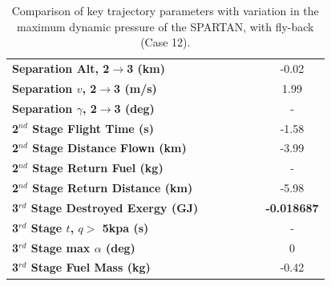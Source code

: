 \begin{table}[ht]
\begin{tabular}{l c c c c c c}
		\textbf{Separation Alt, 2$\rightarrow$3 (km)}
		& \secondthirdSeparationAltqForty
		& \secondthirdSeparationAltqFortyFive
		& \secondthirdSeparationAltqStandard
		& \secondthirdSeparationAltqFiftyFive
		& \secondthirdSeparationAltqSixty
		&-0.02
		\\
		\textbf{Separation $v$, 2$\rightarrow$3 (m/s)}
		& \secondthirdSeparationvqForty
		& \secondthirdSeparationvqFortyFive
		& \secondthirdSeparationvqStandard
		& \secondthirdSeparationvqFiftyFive
		& \secondthirdSeparationvqSixty
		&1.99
		\\
		\textbf{Separation $\gamma$, 2$\rightarrow$3 (deg)}
		& \secondthirdSeparationgammaqForty
		& \secondthirdSeparationgammaqFortyFive
		& \secondthirdSeparationgammaqStandard
		& \secondthirdSeparationgammaqFiftyFive
		& \secondthirdSeparationgammaqSixty
		& -
		\\
		\textbf{2$^{nd}$ Stage Flight Time (s)}
		& \secondFlightTimeqForty
		& \secondFlightTimeqFortyFive
		& \secondFlightTimeqStandard
		& \secondFlightTimeqFiftyFive
		& \secondFlightTimeqSixty
		&-1.58
		\\
		\textbf{2$^{nd}$ Stage Distance Flown (km)}
		& \SecondDistqForty
		& \SecondDistqFortyFive
		& \SecondDistqStandard
		& \SecondDistqFiftyFive
		& \SecondDistqSixty
		&-3.99
		\\
		\textbf{2$^{nd}$ Stage Return Fuel (kg)}
		& \returnFuelqForty
		& \returnFuelqFortyFive
		& \returnFuelqStandard
		& \returnFuelqFiftyFive
		& \returnFuelqSixty
		& -
		\\
		\textbf{2$^{nd}$ Stage Return Distance (km)}
		& \returnDistqForty
		& \returnDistqFortyFive
		& \returnDistqStandard
		& \returnDistqFiftyFive
		& \returnDistqSixty
		&-5.98
		\\
		\hline 
		\textbf{3$^{rd}$ Stage Destroyed Exergy (GJ)}
		& \textbf{\thirdExergyDestroyedqForty}
		& \textbf{\thirdExergyDestroyedqFortyFive}
		& \textbf{\thirdExergyDestroyedqStandard}
		& \textbf{\thirdExergyDestroyedqFiftyFive}
		& \textbf{\thirdExergyDestroyedqSixty}
		& \textbf{-0.018687}
		\\
		\textbf{3$^{rd}$ Stage $t$, $q >$ 5kpa (s)}
		& \thirdqOverFiveqForty
		& \thirdqOverFiveqFortyFive
		& \thirdqOverFiveqStandard
		& \thirdqOverFiveqFiftyFive
		& \thirdqOverFiveqSixty
		& -
		\\
		\textbf{3$^{rd}$ Stage max $\alpha$ (deg)}
		& \thirdmaxAoAqForty
		& \thirdmaxAoAqFortyFive
		& \thirdmaxAoAqStandard
		& \thirdmaxAoAqFiftyFive
		& \thirdmaxAoAqSixty
		&0
		\\
		\textbf{3$^{rd}$ Stage Fuel Mass (kg)}
		& \thirdmFuelqForty
		& \thirdmFuelqFortyFive
		& \thirdmFuelqStandard
		& \thirdmFuelqFiftyFive
		& \thirdmFuelqSixty
		&-0.42
		\\
		\hline 
	\end{tabular} 
	\caption{Comparison of key trajectory parameters with variation in the maximum dynamic pressure of the SPARTAN, with fly-back (Case 12).}
	\label{tab:qvarreturn}
\end{table}


